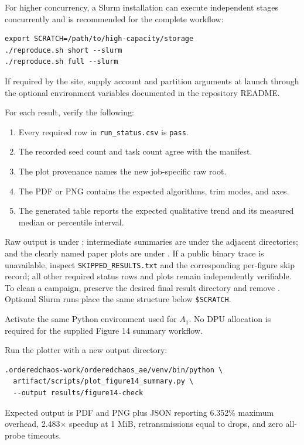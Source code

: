 \documentclass[conference]{IEEEtran}
\begin{document}
For higher concurrency, a Slurm installation can execute independent stages
concurrently and is recommended for the complete workflow:

\begin{verbatim}
export SCRATCH=/path/to/high-capacity/storage
./reproduce.sh short --slurm
./reproduce.sh full --slurm
\end{verbatim}

If required by the site, supply account and partition arguments at launch
through the optional environment variables documented in the repository
README.

\artout
For each result, verify the following:
\begin{enumerate}
\item Every required row in \texttt{run\_status.csv} is \texttt{pass}.
\item The recorded seed count and task count agree with the manifest.
\item The plot provenance names the new job-specific raw root.
\item The PDF or PNG contains the expected algorithms, trim modes, and axes.
\item The generated table reports the expected qualitative trend and its
measured median or percentile interval.
\end{enumerate}

Raw output is under ; intermediate
summaries are under the adjacent  directories; and the clearly
named paper plots are under . If a public binary trace is
unavailable, inspect \texttt{SKIPPED\_RESULTS.txt} and the corresponding
per-figure skip record; all other required status rows and plots remain
independently verifiable. To clean a campaign, preserve the desired final
result directory and remove . Optional Slurm runs
place the same structure below \texttt{\$SCRATCH}.

\artin
Activate the same Python environment used for $A_1$. No DPU allocation is
required for the supplied Figure 14 summary workflow.

\artcomp
Run the plotter with a new output directory:

\begin{verbatim}
.orderedchaos-work/orderedchaos_ae/venv/bin/python \
  artifact/scripts/plot_figure14_summary.py \
  --output results/figure14-check
\end{verbatim}

\artout
Expected output is PDF and PNG plus JSON reporting 6.352\% maximum overhead,
2.483$\times$ speedup at 1 MiB, retransmissions equal to drops, and zero
all-probe timeouts.
\end{document}
